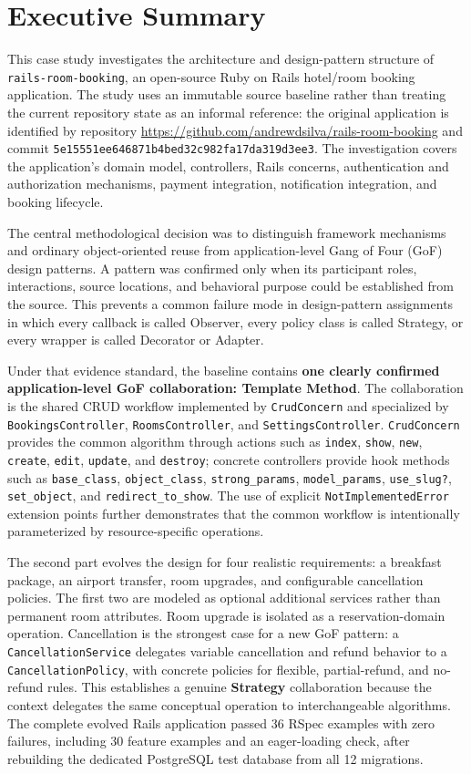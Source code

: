 \documentclass[10pt,a4paper]{article}
\newcommand{\code}[1]{\texttt{\small #1}}
\newcommand{\repo}{\url{https://github.com/andrewdsilva/rails-room-booking}}
\newcommand{\baseline}{\code{5e15551ee646871b4bed32c982fa17da319d3ee3}}
\begin{document}
\section{Executive Summary}

This case study investigates the architecture and design-pattern structure of \code{rails-room-booking}, an open-source Ruby on Rails hotel/room booking application. The study uses an immutable source baseline rather than treating the current repository state as an informal reference: the original application is identified by repository \repo{} and commit \baseline. The investigation covers the application's domain model, controllers, Rails concerns, authentication and authorization mechanisms, payment integration, notification integration, and booking lifecycle.

The central methodological decision was to distinguish framework mechanisms and ordinary object-oriented reuse from application-level Gang of Four (GoF) design patterns. A pattern was confirmed only when its participant roles, interactions, source locations, and behavioral purpose could be established from the source. This prevents a common failure mode in design-pattern assignments in which every callback is called Observer, every policy class is called Strategy, or every wrapper is called Decorator or Adapter.

Under that evidence standard, the baseline contains \textbf{one clearly confirmed application-level GoF collaboration: Template Method}. The collaboration is the shared CRUD workflow implemented by \code{CrudConcern} and specialized by \code{BookingsController}, \code{RoomsController}, and \code{SettingsController}. \code{CrudConcern} provides the common algorithm through actions such as \code{index}, \code{show}, \code{new}, \code{create}, \code{edit}, \code{update}, and \code{destroy}; concrete controllers provide hook methods such as \code{base\_class}, \code{object\_class}, \code{strong\_params}, \code{model\_params}, \code{use\_slug?}, \code{set\_object}, and \code{redirect\_to\_show}. The use of explicit \code{NotImplementedError} extension points further demonstrates that the common workflow is intentionally parameterized by resource-specific operations.

The second part evolves the design for four realistic requirements: a breakfast package, an airport transfer, room upgrades, and configurable cancellation policies. The first two are modeled as optional additional services rather than permanent room attributes. Room upgrade is isolated as a reservation-domain operation. Cancellation is the strongest case for a new GoF pattern: a \code{CancellationService} delegates variable cancellation and refund behavior to a \code{CancellationPolicy}, with concrete policies for flexible, partial-refund, and no-refund rules. This establishes a genuine \textbf{Strategy} collaboration because the context delegates the same conceptual operation to interchangeable algorithms. The complete evolved Rails application passed 36 RSpec examples with zero failures, including 30 feature examples and an eager-loading check, after rebuilding the dedicated PostgreSQL test database from all 12 migrations.
\end{document}
